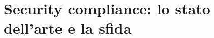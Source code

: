 \documentclass[../main.tex]{subfiles}
\begin{document}
\chapter{Security compliance: lo stato dell'arte e la sfida}
\end{document}
